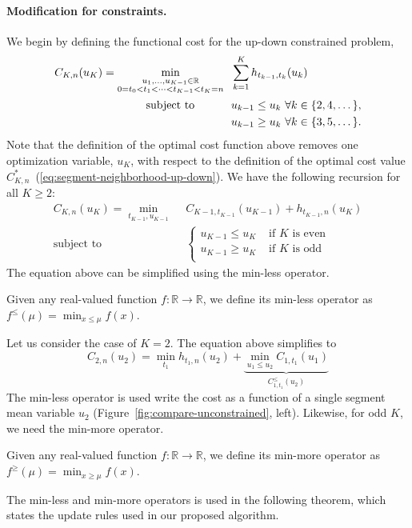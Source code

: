 \documentclass[twoside,11pt]{article}
\newcommand{\RR}{\mathbb R}
\begin{document}
\paragraph{Modification for constraints.} 
We begin by defining the functional cost for the up-down constrained problem,
\begin{align}
  \label{eq:segment-neighborhood-up-down-fun}
C_{K,n}(u_K) = \min_{\substack{
u_1,\dots, u_{K-1}\in\RR
\\
0=t_0<t_1<\cdots<t_{K-1}<t_K=n
}} & \ \
  \sum_{k=1}^K
h_{t_{k-1}, t_k}(u_k)\\
      \text{subject to \hskip 0.8cm} &\ \ u_{k-1} \leq u_k\ \forall k\in\{2,4,\dots\},
  \nonumber\\
  &\ \ u_{k-1} \geq u_k\ \forall k\in\{3,5,\dots\}.
  \nonumber
\end{align}
Note that the definition of the optimal cost function above removes
one optimization variable, $u_K$, with respect to the definition of
the optimal cost value
$C^*_{K,n}$~(\ref{eq:segment-neighborhood-up-down}). We have the
following recursion for all $K\geq 2$:
\begin{align}
  \label{eq:segment-neighborhood-up-down-fun-recursion}
C_{K,n}(u_K) = \min_{t_{K-1},u_{K-1}} & \ \ 
  C_{K-1,t_{K-1}}(u_{K-1})+
h_{t_{K-1},n}(u_K)\\
      \text{subject to} &\ \   \begin{cases}
    u_{K-1}\leq u_K  & \text{ if $K$ is even}\\
    u_{K-1}\geq u_K  & \text{ if $K$ is odd}\\
  \end{cases}
  \nonumber
\end{align}
The equation above can be simplified using the min-less operator.
\begin{definition}[Min-less operator]
\label{def:min-less}
  Given any real-valued function $f:\RR\rightarrow\RR$, we define its min-less
  operator as $f^\leq(\mu)=\min_{x\leq \mu} f(x)$.
\end{definition}
Let us consider the case of $K=2$. The equation above 
simplifies to
\begin{equation}
  \label{eq:segment-neighborhood-up-down-fun-recursion-K2}
C_{2,n}(u_2) = \min_{t_{1}} 
h_{t_{1},n}(u_2)+ \underbrace{
  \min_{u_1\leq u_2} C_{1,t_{1}}(u_{1}) 
}_{C_{1,t_{1}}^\leq(u_2)}
\end{equation}
The min-less operator is used write the cost as a function of a single
segment mean variable $u_2$ (Figure~\ref{fig:compare-unconstrained},
left). Likewise, for odd $K$, we need the min-more operator.
\begin{definition}[Min-more operator]
\label{def:min-more}
  Given any real-valued function $f:\RR\rightarrow\RR$, we define its min-more
  operator as $f^\geq(\mu)=\min_{x\geq \mu} f(x)$.
\end{definition}
The min-less and min-more operators is used in the following
theorem, which states the update rules used in our proposed algorithm.
\end{document}
